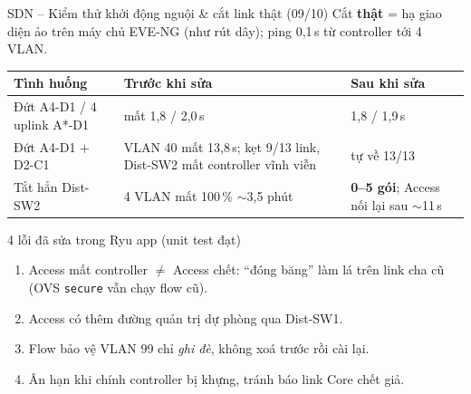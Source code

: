 \documentclass[aspectratio=169, 10pt]{beamer}
\begin{document}
\begin{frame}{SDN -- Kiểm thử khởi động nguội \& cắt link thật (09/10)}
    \footnotesize
    Cắt \textbf{thật} = hạ giao diện ảo trên máy chủ EVE-NG (như rút dây); ping 0,1\,s từ controller tới 4 VLAN.
    \vspace{0.15cm}

    \centering
    \begin{tabular}{@{}p{}p{}p{}@{}}
        \toprule
        \textbf{Tình huống} & \textbf{Trước khi sửa} & \textbf{Sau khi sửa} \\
        \midrule
        Đứt A4-D1 / 4 uplink A*-D1 & mất 1,8 / 2,0\,s & 1,8 / 1,9\,s \\
        Đứt A4-D1 + D2-C1 & VLAN 40 mất 13,8\,s; \alert{kẹt 9/13 link, Dist-SW2 mất controller vĩnh viễn} & tự về 13/13 \\
        Tắt hẳn Dist-SW2 & \alert{4 VLAN mất 100\,\% $\sim$3,5 phút} & \textbf{0--5 gói}; Access nối lại sau $\sim$11\,s \\
        \bottomrule
    \end{tabular}
    \vspace{0.2cm}

    \begin{exampleblock}{4 lỗi đã sửa trong Ryu app (unit test đạt)}
        \footnotesize
        \begin{enumerate}
            \item Access mất controller $\neq$ Access chết: ``đóng băng'' làm lá trên link cha cũ (OVS \texttt{secure} vẫn chạy flow cũ).
            \item Access có thêm đường quản trị dự phòng qua Dist-SW1.
            \item Flow bảo vệ VLAN 99 chỉ \emph{ghi đè}, không xoá trước rồi cài lại.
            \item Ân hạn khi chính controller bị khựng, tránh báo link Core chết giả.
        \end{enumerate}
    \end{exampleblock}
\end{frame}
\end{document}
